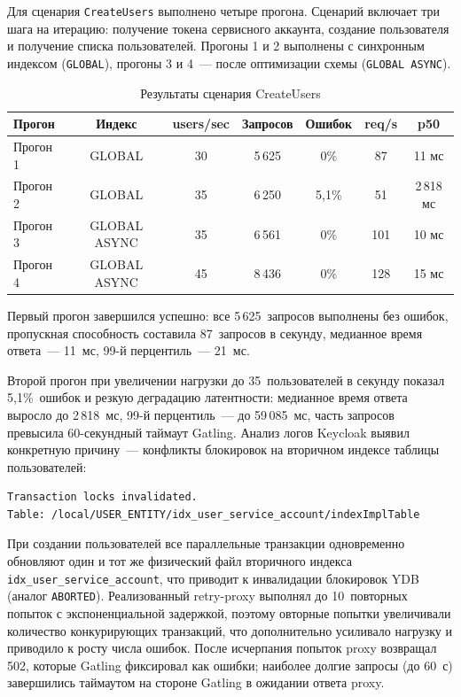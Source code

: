 \documentclass[times]{itmo-student-thesis}
\begin{document}
Для сценария \texttt{CreateUsers} выполнено четыре прогона.
Сценарий включает три шага на итерацию: получение токена сервисного аккаунта,
создание пользователя и получение списка пользователей.
Прогоны 1 и 2 выполнены с синхронным индексом (\texttt{GLOBAL}),
прогоны 3 и 4~--- после оптимизации схемы (\texttt{GLOBAL ASYNC}).


\begin{table}[H]
\centering
\begin{tabular}{|l|c|c|c|c|c|c|}
\hline
\textbf{Прогон} & \textbf{Индекс} & \textbf{users/sec} & \textbf{Запросов} & \textbf{Ошибок} & \textbf{req/s} & \textbf{p50} \\
\hline
Прогон 1 & GLOBAL       & 30 & 5\,625  & 0\%     & 87  & 11 мс \\
Прогон 2 & GLOBAL       & 35 & 6\,250  & 5{,}1\% & 51  & 2\,818 мс \\
Прогон 3 & GLOBAL ASYNC & 35 & 6\,561  & 0\%     & 101 & 10 мс \\
Прогон 4 & GLOBAL ASYNC & 45 & 8\,436  & 0\%     & 128 & 15 мс \\
\hline
\end{tabular}
\caption{Результаты сценария CreateUsers}
\label{tab:load-create-users}
\end{table}

Первый прогон завершился успешно: все 5\,625~запросов выполнены без ошибок,
пропускная способность составила 87~запросов в секунду,
медианное время ответа~--- 11~мс, 99-й перцентиль~--- 21~мс.

Второй прогон при увеличении нагрузки до 35~пользователей в секунду показал
5{,}1\%~ошибок и резкую деградацию латентности: медианное время ответа выросло
до 2\,818~мс, 99-й перцентиль~--- до 59\,085~мс, часть запросов превысила
60-секундный таймаут Gatling.
Анализ логов Keycloak выявил конкретную причину~--- конфликты блокировок
на вторичном индексе таблицы пользователей:

\begin{verbatim}
Transaction locks invalidated.
Table: /local/USER_ENTITY/idx_user_service_account/indexImplTable
\end{verbatim}

При создании пользователей все параллельные транзакции одновременно
обновляют один и тот же физический файл вторичного индекса
\texttt{idx\_user\_service\_account}, что приводит к инвалидации блокировок YDB
(аналог \texttt{ABORTED}).
Реализованный retry-proxy выполнял до 10~повторных попыток с экспоненциальной
задержкой, поэтому овторные попытки увеличивали количество конкурирующих транзакций,
что дополнительно усиливало нагрузку и приводило к росту числа ошибок.
После исчерпания попыток proxy возвращал 502, которые Gatling фиксировал как
ошибки; наиболее долгие запросы (до 60~с) завершились таймаутом на стороне
Gatling в ожидании ответа proxy.
\end{document}
